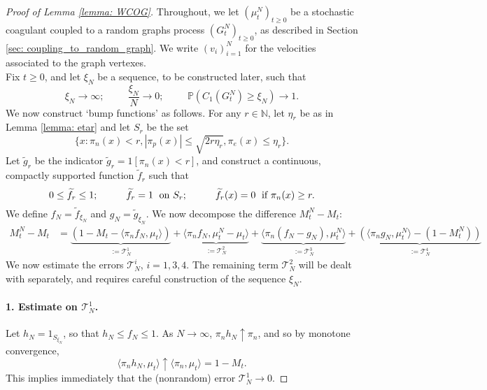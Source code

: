 \begin{proof}[Proof of Lemma \ref{lemma: WCOG}]  Throughout, we let $(\mu^N_t)_{t\geq 0}$ be a stochastic coagulant coupled to a random graphs process $(G^N_t)_{t\geq 0}$, as described in Section \ref{sec: coupling_to_random_graph}. We write $(v_i)_{i=1}^N$ for the velocities associated to the graph vertexes. \medskip \\ Fix $t\ge 0$, and let $\xi_N$ be a sequence, to be constructed later, such that \begin{equation}\label{eq: choice of xiN for WCOG}
       \xi_N\rightarrow \infty; \hspace{1cm} \frac{\xi_N}{N}\rightarrow 0; \hspace{1cm}\mathbb{P}(C_1(G^N_t)\geq \xi_N)\rightarrow 1.
   \end{equation}  We now construct `bump functions' as follows.  For any $r \in \mathbb{N}$, let $\eta_r$ be as in Lemma \ref{lemma: etar} and let $S_r$ be the set \begin{equation}
       \{x: \pi_n(x)< r, |\pi_p(x)|\leq \sqrt{2r\eta_r}, \pi_e(x)\leq \eta_r\}.
   \end{equation} Let $\widetilde{g}_r$ be the indicator $\widetilde{g}_r=1[\pi_n(x)< r]$, and construct a continuous, compactly supported function $\widetilde{f}_r$ such that \begin{equation}
      0\leq \widetilde{f}_r\leq 1;\hspace{1cm} \widetilde{f}_r=1 \hspace{0.1cm} \text{ on } S_r;\hspace{1cm} \widetilde{f}_r(x)=0 \hspace{0.1cm} \text{ if } \pi_n(x)\ge r.
   \end{equation} We define $f_N=\widetilde{f}_{\xi_N}$ and $g_N=\widetilde{g}_{\xi_N}$.  We now decompose the difference $M^N_t-M_t:$ \begin{equation}\label{eq: decomposition of erorr in WCOG}\begin{split} M^N_t-M_t &= \underbrace{(1-M_t-\langle \pi_n f_N, \mu_t\rangle)}_{:=\mathcal{T}^1_N} + \underbrace{\langle \pi_n f_N, \mu^N_t-\mu_t\rangle}_{:=\mathcal{T}^2_N} + \underbrace{\langle \pi_n (f_N-g_N), \mu^N_t\rangle}_{:=\mathcal{T}^3_N} +\underbrace{(
   \langle \pi_n g_N, \mu^N_t\rangle - (1-M^N_t))}_{:=\mathcal{T}^4_N}\end{split} \end{equation} We now estimate the errors $\mathcal{T}^i_N$, $i=1,3,4.$ The remaining term $\mathcal{T}^2_N$ will be dealt with separately, and requires careful construction of the sequence $\xi_N$. \paragraph{1. Estimate on $\mathcal{T}^1_N$.} Let $h_N=1_{S_{\xi_N}}$, so that $h_N \le f_N \le 1$. As $N\rightarrow \infty$, $\pi_n h_N \uparrow \pi_n$, and so by monotone convergence, \begin{equation}
       \langle \pi_n h_N, \mu_t\rangle \uparrow \langle \pi_n, \mu_t\rangle =1-M_t.
   \end{equation} This implies immediately that the (nonrandom) error $\mathcal{T}^1_N \rightarrow 0$.

\end{proof}
